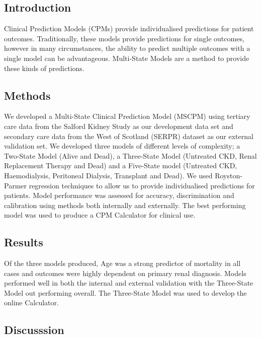 \documentclass[12pt,PhD,twoside,openright]{muthesis}
\begin{document}
\hypertarget{introduction-6}{%
\subsection*{Introduction}\label{introduction-6}}

Clinical Prediction Models (CPMs) provide individualised predictions for patient outcomes. Traditionally, these models provide predictions for single outcomes, however in many circumstances, the ability to predict multiple outcomes with a single model can be advantageous. Multi-State Models are a method to provide these kinds of predictions.

\hypertarget{methods-5}{%
\subsection*{Methods}\label{methods-5}}

We developed a Multi-State Clinical Prediction Model (MSCPM) using tertiary care data from the Salford Kidney Study as our development data set and secondary care data from the West of Scotland (SERPR) dataset as our external validation set. We developed three models of different levels of complexity; a Two-State Model (Alive and Dead), a Three-State Model (Untreated CKD, Renal Replacement Therapy and Dead) and a Five-State model (Untreated CKD, Haemodialysis, Peritoneal Dialysis, Transplant and Dead). We used Royston-Parmer regression techniques to allow us to provide individualised predictions for patients. Model performance was assessed for accuracy, discrimination and calibration using methods both internally and externally. The best performing model was used to produce a CPM Calculator for clinical use.

\hypertarget{results-4}{%
\subsection*{Results}\label{results-4}}

Of the three models produced, Age was a strong predictor of mortality in all cases and outcomes were highly dependent on primary renal diagnosis. Models performed well in both the internal and external validation with the Three-State Model out performing overall. The Three-State Model was used to develop the online Calculator.

\hypertarget{discusssion}{%
\subsection*{Discusssion}\label{discusssion}}
\end{document}
